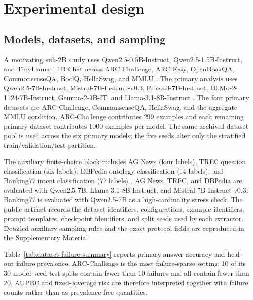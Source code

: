 \documentclass[preprint,12pt,authoryear]{elsarticle}
\begin{document}
\section{Experimental design}
\subsection{Models, datasets, and sampling}
A motivating sub-2B study uses Qwen2.5-0.5B-Instruct, Qwen2.5-1.5B-Instruct, and TinyLlama-1.1B-Chat across ARC-Challenge, ARC-Easy, OpenBookQA, CommonsenseQA, BoolQ, HellaSwag, and MMLU \citep{clark2018arc,mihaylov2018openbookqa,talmor2019commonsenseqa,clark2019boolq,zellers2019hellaswag,hendrycks2021mmlu,yang2024qwen,zhang2024tinyllama}. The primary analysis uses Qwen2.5-7B-Instruct, Mistral-7B-Instruct-v0.3, Falcon3-7B-Instruct, OLMo-2-1124-7B-Instruct, Gemma-2-9B-IT, and Llama-3.1-8B-Instruct \citep{yang2024qwen,jiang2023mistral,falcon3modelcard,olmo22025,gemmateam2024gemma2,dubey2024llama3}. The four primary datasets are ARC-Challenge, CommonsenseQA, HellaSwag, and the aggregate MMLU condition. ARC-Challenge contributes 299 examples and each remaining primary dataset contributes 1000 examples per model. The same archived dataset pool is used across the six primary models; the five seeds alter only the stratified train/validation/test partition.

The auxiliary finite-choice block includes AG News (four labels), TREC question classification (six labels), DBPedia ontology classification (14 labels), and Banking77 intent classification (77 labels) \citep{zhang2015character,li2002trec,lehmann2015dbpedia,casanueva2020banking77}. AG News, TREC, and DBPedia are evaluated with Qwen2.5-7B, Llama-3.1-8B-Instruct, and Mistral-7B-Instruct-v0.3; Banking77 is evaluated with Qwen2.5-7B as a high-cardinality stress check. The public artifact records the dataset identifiers, configurations, example identifiers, prompt templates, checkpoint identifiers, and split seeds used by each extractor. Detailed auxiliary sampling rules and the exact protocol fields are reproduced in the Supplementary Material.

Table~\ref{tab:dataset-failure-summary} reports primary answer accuracy and held-out failure prevalence. ARC-Challenge is the most failure-sparse setting: 10 of its 30 model--seed test splits contain fewer than 10 failures and all contain fewer than 20. AUPRC and fixed-coverage risk are therefore interpreted together with failure counts rather than as prevalence-free quantities.
\end{document}
